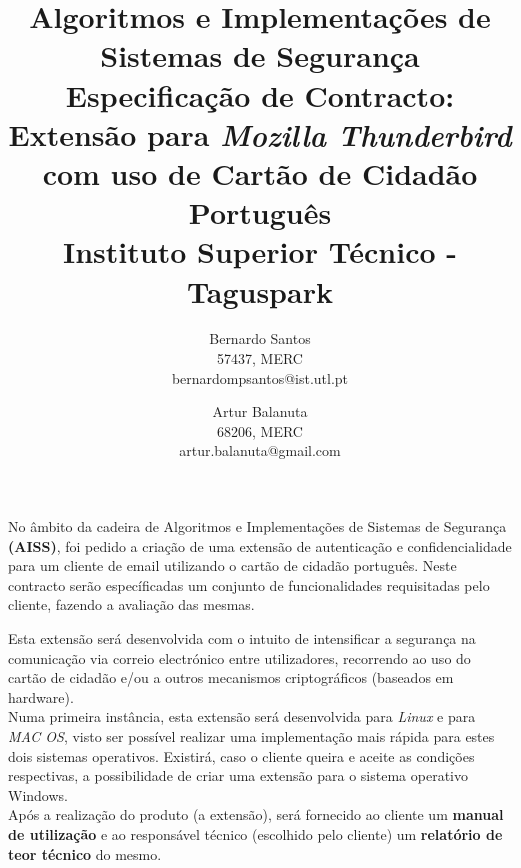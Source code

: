 \documentclass[times, 10pt,twocolumn]{article}
\begin{document}
\title{Algoritmos e Implementa\c{c}\~oes de Sistemas de Seguran\c{c}a\\
Especifica\c{c}\~ao de Contracto: \\
Extens\~ao para \emph{Mozilla Thunderbird} com uso de Cart\~ao de Cidad\~ao Portugu\^es 
\\ Instituto Superior T\'ecnico - Taguspark}

\author{Bernardo Santos\\ 57437, MERC \\  bernardompsantos@ist.utl.pt\\
\and
Artur Balanuta\\
68206, MERC\\
artur.balanuta@gmail.com\\
}

\maketitle
\thispagestyle{empty}

No \^ambito da cadeira de Algoritmos e Implementa\c{c}\~oes de Sistemas de Seguran\c{c}a \textbf{(AISS)}, foi pedido a cria\c{c}\~ao de uma extens\~ao de autentica\c{c}\~ao e confidencialidade para um cliente de email utilizando o cart\~ao de cidad\~ao portugu\^es. Neste contracto ser\~ao espec\'ificadas um conjunto de funcionalidades requisitadas pelo cliente, fazendo a avalia\c{c}\~ao das mesmas.

Esta extens\~ao ser\'a desenvolvida com o intuito de intensificar a seguran\c{c}a na comunica\c{c}\~ao via correio electr\'onico entre utilizadores, recorrendo ao uso do cart\~ao de cidad\~ao e/ou a outros mecanismos criptogr\'aficos (baseados em hardware).\\
\indent Numa primeira inst\^ancia, esta extens\~ao ser\'a desenvolvida para \emph{Linux} e para \emph{MAC OS}, visto ser poss\'ivel realizar uma implementa\c{c}\~ao mais r\'apida para estes dois sistemas operativos. Existir\'a, caso o cliente queira e aceite as condi\c{c}\~oes respectivas, a possibilidade de criar uma extens\~ao para o sistema operativo Windows.\\
\indent Ap\'os a realiza\c{c}\~ao do produto (a extens\~ao), ser\'a fornecido ao cliente um \textbf{manual de utiliza\c{c}\~ao} e ao respons\'avel t\'ecnico (escolhido pelo cliente) um \textbf{relat\'orio de teor t\'ecnico} do mesmo.
\end{document}
